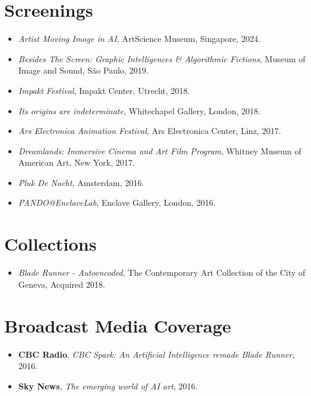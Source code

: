 \documentclass[letterpaper,11pt]{article}
\newcommand{\resumeItem}[2]{
  \item\small{
    \textbf{#1}{ #2 \vspace{-2pt}}
  }
}
\newcommand{\resumeSubItem}[2]{\resumeItem{#1}{#2}\vspace{-4pt}}
\newcommand{\resumeSubHeadingListStart}{\begin{itemize}[leftmargin=*]}
\newcommand{\resumeSubHeadingListEnd}{\end{itemize}}
\begin{document}
\section{Screenings}
 \resumeSubHeadingListStart
  \resumeSubItem{}{\textit{Artist Moving Image in AI}, ArtScience Museum, Singapore, 2024.}
  \resumeSubItem{}{\textit{Besides The Screen: Graphic Intelligences \& Algorithmic Fictions}, Museum of Image and Sound, São Paulo, 2019.}
  \resumeSubItem{}{\textit{Impakt Festival}, Impakt Center, Utrecht, 2018.}
  \resumeSubItem{}{\textit{Its origins are indeterminate}, Whitechapel Gallery, London, 2018.}
  \resumeSubItem{}{\textit{Ars Electronica Animation Festival}, Ars Electronica Center, Linz, 2017.}
  \resumeSubItem{}{\textit{Dreamlands: Immersive Cinema and Art Film Program}, Whitney Museum of American Art, New York, 2017.}
  \resumeSubItem{}{\textit{Pluk De Nacht}, Amsterdam, 2016.}
  \resumeSubItem{}{\textit{PANDO@EnclaveLab}, Enclave Gallery, London, 2016.}
 \resumeSubHeadingListEnd
 
 \section{Collections}
 \resumeSubHeadingListStart
  \resumeSubItem{}{\textit{Blade Runner - Autoencoded}, The Contemporary Art Collection of the City of Geneva, Acquired 2018.}
 \resumeSubHeadingListEnd

 \section{Broadcast Media Coverage}
 \resumeSubHeadingListStart
 \resumeSubItem{}{\textbf{CBC Radio}, \textit{CBC Spark: An Artificial Intelligence remade Blade Runner}, 2016.}
  \resumeSubItem{}{\textbf{Sky News}, \textit{The emerging world of AI art}, 2016.}
 \resumeSubHeadingListEnd
 
\end{document}
